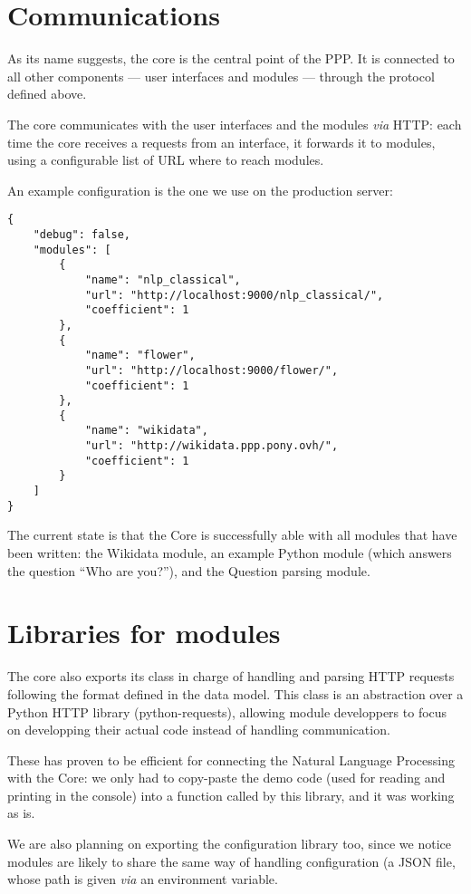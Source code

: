 \section{Communications}

As its name suggests, the core is the central point of the PPP. It is
connected to all other components — user interfaces and modules — through
the protocol defined above.

The core communicates with the user interfaces and the modules {\em via} HTTP:
each time the core receives a requests from an interface, it forwards it
to modules, using a configurable list of URL where to reach modules.

An example configuration is the one we use on the production server:

\begin{verbatim}
{
    "debug": false,
    "modules": [
        {
            "name": "nlp_classical",
            "url": "http://localhost:9000/nlp_classical/",
            "coefficient": 1
        },
        {
            "name": "flower",
            "url": "http://localhost:9000/flower/",
            "coefficient": 1
        },
        {
            "name": "wikidata",
            "url": "http://wikidata.ppp.pony.ovh/",
            "coefficient": 1
        }
    ]
}
\end{verbatim}

The current state is that the Core is successfully able with all modules
that have been written: the Wikidata module, an example Python module
(which answers the question  “Who are you?”), and the Question parsing module.

\section{Libraries for modules}

The core also exports its class in charge of handling and parsing HTTP
requests following the format defined in the data model.
This class is an abstraction over a Python HTTP library (python-requests),
allowing module developpers to focus on developping their actual code
instead of handling communication.

These has proven to be efficient for connecting the Natural Language
Processing with the Core: we only had to copy-paste the demo code
(used for reading and printing in the console) into a function called
by this library, and it was working as is.


We are also planning on exporting the configuration
library too, since we notice modules are likely to share the
same way of handling configuration (a JSON file, whose path
is given {\em via} an environment variable.

